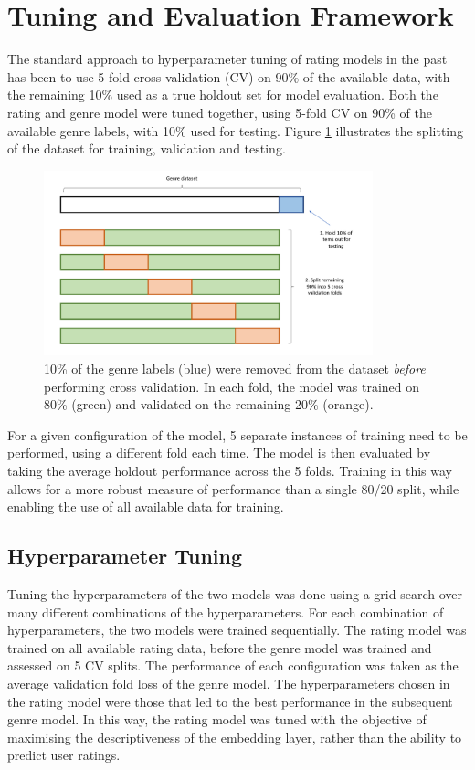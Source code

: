 \section{Tuning and Evaluation Framework}
The standard approach to hyperparameter tuning of rating models in the past has been to use 5-fold cross validation (CV) on 90\% of the available data, with the remaining 10\% used as a true holdout set for model evaluation. Both the rating and genre model were tuned together, using 5-fold CV on 90\% of the available genre labels, with 10\% used for testing. Figure \ref{fig:4_cross-validation} illustrates the splitting of the dataset for training, validation and testing.

\begin{figure}[H]
\centering
\includegraphics[width=0.85\textwidth]{Figures/4_cross-validation-2.pdf}
\decoRule
\caption[Holdout set]{10\% of the genre labels (blue) were removed from the dataset \textit{before} performing cross validation. In each fold, the model was trained on 80\% (green) and validated on the remaining 20\% (orange).}
\label{fig:4_cross-validation}
\end{figure}

For a given configuration of the model, 5 separate instances of training need to be performed, using a different fold each time. The model is then evaluated by taking the average holdout performance across the 5 folds. Training in this way allows for a more robust measure of performance than a single 80/20 split, while enabling the use of all available data for training.

\subsection{Hyperparameter Tuning}
Tuning the hyperparameters of the two models was done using a grid search over many different combinations of the hyperparameters. For each combination of hyperparameters, the two models were trained sequentially. The rating model was trained on all available rating data, before the genre model was trained and assessed on 5 CV splits. The performance of each configuration was taken as the average validation fold loss of the genre model. The hyperparameters chosen in the rating model were those that led to the best performance in the subsequent genre model. In this way, the rating model was tuned with the objective of maximising the descriptiveness of the embedding layer, rather than the ability to predict user ratings.


